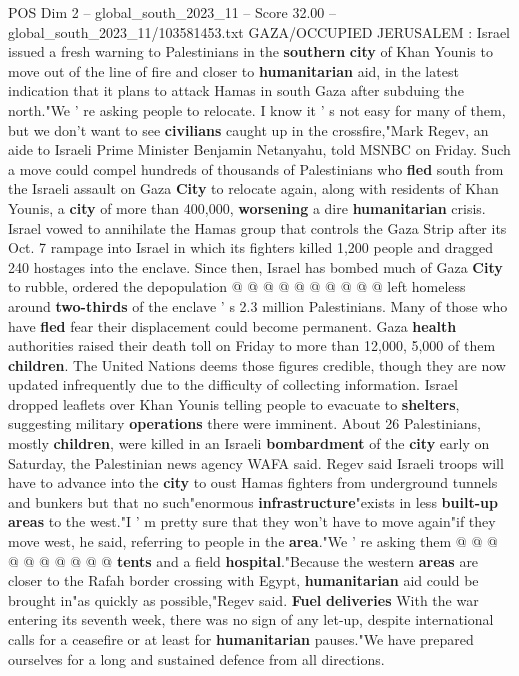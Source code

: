 \begin{textsample}{POS Dim 2 – global\_south\_2023\_11 – Score 32.00 – global\_south\_2023\_11/103581453.txt}  \label{ex:f2_pos_094}
GAZA/OCCUPIED JERUSALEM : Israel issued a fresh warning to Palestinians in the \textbf{southern} \textbf{city} of Khan Younis to move out of the line of fire and closer to \textbf{humanitarian} aid, in the latest indication that it plans to attack Hamas in south Gaza after subduing the north."We ' re asking people to relocate.
I know it ' s not easy for many of them, but we don't want to see \textbf{civilians} caught up in the crossfire,"Mark Regev, an aide to Israeli Prime Minister Benjamin Netanyahu, told MSNBC on Friday.
Such a move could compel hundreds of thousands of Palestinians who \textbf{fled} south from the Israeli assault on Gaza \textbf{City} to relocate again, along with residents of Khan Younis, a \textbf{city} of more than 400,000, \textbf{worsening} a dire \textbf{humanitarian} crisis.
Israel vowed to annihilate the Hamas group that controls the Gaza Strip after its Oct. 7 rampage into Israel in which its fighters killed 1,200 people and dragged 240 hostages into the enclave.
Since then, Israel has bombed much of Gaza \textbf{City} to rubble, ordered the depopulation @ @ @ @ @ @ @ @ @ @ left homeless around \textbf{two-thirds} of the enclave ' s 2.3 million Palestinians.
Many of those who have \textbf{fled} fear their displacement could become permanent.
Gaza \textbf{health} authorities raised their death toll on Friday to more than 12,000, 5,000 of them \textbf{children}.
The United Nations deems those figures credible, though they are now updated infrequently due to the difficulty of collecting information.
Israel dropped leaflets over Khan Younis telling people to evacuate to \textbf{shelters}, suggesting military \textbf{operations} there were imminent.
About 26 Palestinians, mostly \textbf{children}, were killed in an Israeli \textbf{bombardment} of the \textbf{city} early on Saturday, the Palestinian news agency WAFA said.
Regev said Israeli troops will have to advance into the \textbf{city} to oust Hamas fighters from underground tunnels and bunkers but that no such"enormous \textbf{infrastructure}"exists in less \textbf{built-up} \textbf{areas} to the west."I ' m pretty sure that they won't have to move again"if they move west, he said, referring to people in the \textbf{area}."We ' re asking them @ @ @ @ @ @ @ @ @ @ \textbf{tents} and a field \textbf{hospital}."Because the western \textbf{areas} are closer to the Rafah border crossing with Egypt, \textbf{humanitarian} aid could be brought in"as quickly as possible,"Regev said. \textbf{Fuel} \textbf{deliveries} With the war entering its seventh week, there was no sign of any let-up, despite international calls for a ceasefire or at least for \textbf{humanitarian} pauses."We have prepared ourselves for a long and sustained defence from all directions.

\end{textsample}
